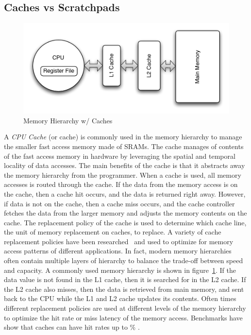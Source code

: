 \subsection{Caches vs Scratchpads}
\begin{figure}
  \vspace{-20pt}
  \begin{center}
    \includegraphics[scale=.5]{figs/conventional_mem_hierarchy}
  \end{center}
  \vspace{-20pt}
  \caption{Memory Hierarchy w/ Caches}
  \label{fig:conventional_mem_hierarchy}
  \vspace{-10pt}
\end{figure}   
A \emph{CPU Cache} (or cache) is commonly used in the memory hierarchy to manage the smaller fast access memory made of SRAMs.
The cache manages of contents of the fast access memory in hardware by leveraging the spatial and temporal locality of data accesses. 
The main benefits of the cache is that it abstracts away the memory hierarchy from the programmer.
When a cache is used, all memory accesses is routed through the cache. 
If the data from the memory access is on the cache, then a cache hit occurs, and the data is returned right away.
However, if data is not on the cache, then a cache miss occurs, and the cache controller fetches the data from the larger memory and adjusts the memory contents on the cache. 
The replacement policy of the cache is used to determine which cache line, the unit of memory replacement on caches, to replace. 
A variety of cache replacement policies have been researched~ and used to optimize for memory access patterns of different applications. 
In fact, modern memory hierarchies often contain multiple layers of hierarchy to balance the trade-off between speed and capacity.
A commonly used memory hierarchy is shown in figure~\ref{fig:conventional_mem_hierarchy}.
If the data value is not found in the L1 cache, then it is searched for in the L2 cache. 
If the L2 cache also misses, then the data is retrieved from main memory, and sent back to the CPU while the L1 and L2 cache updates its contents.
Often times different replacement policies are used at different levels of the memory hierarchy to optimize the hit rate or miss latency of the memory access.
Benchmarks have show that caches can have hit rates up to \% . 


